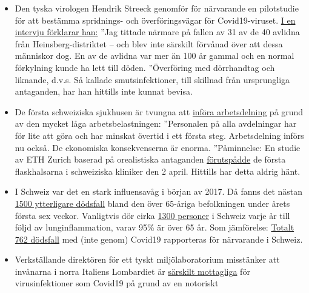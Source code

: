 \begin{itemize}
\tightlist
\item
  Den tyska virologen Hendrik Streeck genomför för närvarande en
  pilotstudie för att bestämma spridnings- och överföringsvägar för
  Covid19-viruset.
  \href{https://www.zeit.de/wissen/gesundheit/2020-04/hendrik-streeck-covid-19-heinsberg-symptome-infektionsschutz-massnahmen-studie/komplettansicht}{I
  en intervju förklarar han:} ''Jag tittade närmare på fallen av 31 av
  de 40 avlidna från Heinsberg-distriktet -- och blev inte särskilt
  förvånad över att dessa människor dog. En av de avlidna var mer än 100
  år gammal och en normal förkylning kunde ha lett till döden.
  ''Överföring med dörrhandtag och liknande, d.v.s. Så kallade
  smutsinfektioner, till skillnad från ursprungliga antaganden, har han
  hittills inte kunnat bevisa.
\item
  De första schweiziska sjukhusen är tvungna att
  \href{https://www.engadinerpost.ch/2020/4/04/Engadiner-Spitaeler-haben-freie-Kapazitaeten}{införa
  arbetsdelning} på grund av den mycket låga arbetsbelastningen:
  ''Personalen på alla avdelningar har för lite att göra och har minskat
  övertid i ett första steg. Arbetsdelning införs nu också. De
  ekonomiska konsekvenserna är enorma. ''Påminnelse: En studie av ETH
  Zurich baserad på orealistiska antaganden
  \href{https://www.toponline.ch/news/coronavirus/detail/news/studie-bestaetigt-engpass-bei-spitalbetten-steht-kurz-bevor-00131333/}{förutspådde}
  de första flaskhalsarna i schweiziska kliniker den 2 april. Hittills
  har detta aldrig hänt.
\item
  I Schweiz var det en stark influensavåg i början av 2017. Då fanns det
  nästan
  \href{https://www.srf.ch/news/schweiz/todesursachen-statistik-woran-die-meisten-schweizerinnen-und-schweizer-sterben}{1500
  ytterligare dödsfall} bland den över 65-åriga befolkningen under årets
  första sex veckor. Vanligtvis dör cirka
  \href{https://www.nzz.ch/lungenentzuendung-1.4550285}{1300 personer} i
  Schweiz varje år till följd av lunginflammation, varav 95\% är över 65
  år. Som jämförelse: \href{https://www.corona-data.ch/}{Totalt 762
  dödsfall} med (inte genom) Covid19 rapporteras för närvarande i
  Schweiz.
\item
  Verkställande direktören för ett tyskt miljölaboratorium misstänker
  att invånarna i norra Italiens Lombardiet är
  \href{https://m.apotheke-adhoc.de/nachrichten/detail/coronavirus/erhoehen-legionellen-die-todesrate-einer-corona-infektion/}{särskilt
  mottagliga} för virusinfektioner som Covid19 på grund av en notoriskt

\end{itemize}
